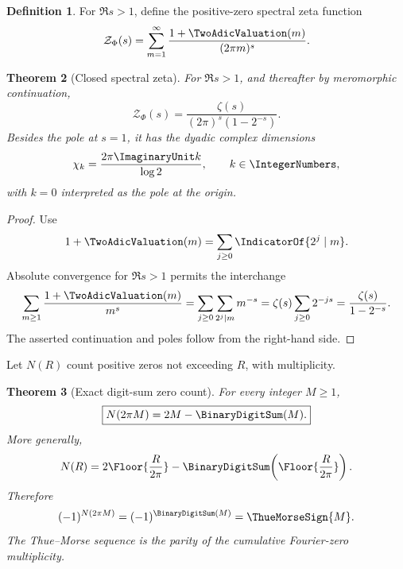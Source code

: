 \documentclass[11pt,oneside]{article}
\newtheorem{theorem}{Theorem}[section]
\theoremstyle{definition}
\newtheorem{definition}[theorem]{Definition}
\theoremstyle{remark}
\begin{document}
\begin{definition}
For \(\Re s>1\), define the positive-zero spectral zeta function
\begin{equation}
 \mathcal Z_\Phi(s)
 =\sum_{m=1}^{\infty}
   \frac{1+\TwoAdicValuation(m)}{(2\pi m)^s}.
 \label{eq:spectral-zeta-def}
\end{equation}
\end{definition}

\begin{theorem}[Closed spectral zeta]
\label{thm:spectral-zeta}
For \(\Re s>1\), and thereafter by meromorphic continuation,
\begin{equation}
 \boxed{\displaystyle
 \mathcal Z_\Phi(s)
 =\frac{\zeta(s)}{(2\pi)^s(1-2^{-s})}.}
 \label{eq:spectral-zeta}
\end{equation}
Besides the pole at \(s=1\), it has the dyadic complex dimensions
\begin{equation}
 \chi_k=\frac{2\pi\ImaginaryUnit k}{\log2},
 \qquad k\in\IntegerNumbers,
 \label{eq:complex-dimensions}
\end{equation}
with \(k=0\) interpreted as the pole at the origin.
\end{theorem}

\begin{proof}
Use
\[
 1+\TwoAdicValuation(m)=\sum_{j\geq0}\IndicatorOf{2^j\mid m}.
\]
Absolute convergence for \(\Re s>1\) permits the interchange
\[
 \sum_{m\geq1}\frac{1+\TwoAdicValuation(m)}{m^s}
 =\sum_{j\geq0}\sum_{2^j\mid m}m^{-s}
 =\zeta(s)\sum_{j\geq0}2^{-js}
 =\frac{\zeta(s)}{1-2^{-s}}.
\]
The asserted continuation and poles follow from the right-hand side.
\end{proof}

Let \(N(R)\) count positive zeros not exceeding \(R\), with multiplicity.

\begin{theorem}[Exact digit-sum zero count]
\label{thm:zero-count}
For every integer \(M\geq1\),
\begin{equation}
 \boxed{\displaystyle
 N(2\pi M)=2M-\BinaryDigitSum(M).}
 \label{eq:zero-count}
\end{equation}
More generally,
\[
 N(R)=2\Floor{\frac{R}{2\pi}}
      -\BinaryDigitSum\!\left(\Floor{\frac{R}{2\pi}}\right).
\]
Therefore
\begin{equation}
 (-1)^{N(2\pi M)}=(-1)^{\BinaryDigitSum(M)}=\ThueMorseSign{M}.
 \label{eq:TM-spectral-parity}
\end{equation}
The Thue--Morse sequence is the parity of the cumulative Fourier-zero
multiplicity.
\end{theorem}
\end{document}
